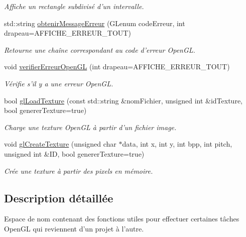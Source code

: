 \begin{DoxyCompactItemize}
\begin{DoxyCompactList}\small\item\em Affiche un rectangle subdivisé d'un intervalle. \end{DoxyCompactList}\item 
std\-::string \hyperlink{namespaceaidegl_a19ef7b4b71b7a1568393cfc78be46a91}{obtenir\-Message\-Erreur} (G\-Lenum code\-Erreur, int drapeau=A\-F\-F\-I\-C\-H\-E\-\_\-\-E\-R\-R\-E\-U\-R\-\_\-\-T\-O\-U\-T)
\begin{DoxyCompactList}\small\item\em Retourne une chaîne correspondant au code d'erreur Open\-G\-L. \end{DoxyCompactList}\item 
void \hyperlink{namespaceaidegl_a923ac6c4f17f9d93b072c786e0f86d41}{verifier\-Erreur\-Open\-G\-L} (int drapeau=A\-F\-F\-I\-C\-H\-E\-\_\-\-E\-R\-R\-E\-U\-R\-\_\-\-T\-O\-U\-T)
\begin{DoxyCompactList}\small\item\em Vérifie s'il y a une erreur Open\-G\-L. \end{DoxyCompactList}\item 
bool \hyperlink{namespaceaidegl_a6bba7d34e4998b9c94fe5971ecf535c0}{gl\-Load\-Texture} (const std\-::string \&nom\-Fichier, unsigned int \&id\-Texture, bool generer\-Texture=true)
\begin{DoxyCompactList}\small\item\em Charge une texture Open\-G\-L à partir d'un fichier image. \end{DoxyCompactList}\item 
void \hyperlink{namespaceaidegl_af6f5a219dd414d647d8e4d92b6c30fd5}{gl\-Create\-Texture} (unsigned char $\ast$data, int x, int y, int bpp, int pitch, unsigned int \&I\-D, bool generer\-Texture=true)
\begin{DoxyCompactList}\small\item\em Crée une texture à partir des pixels en mémoire. \end{DoxyCompactList}\end{DoxyCompactItemize}


\subsection{Description détaillée}
Espace de nom contenant des fonctions utiles pour effectuer certaines tâches Open\-G\-L qui reviennent d'un projet à l'autre. 

